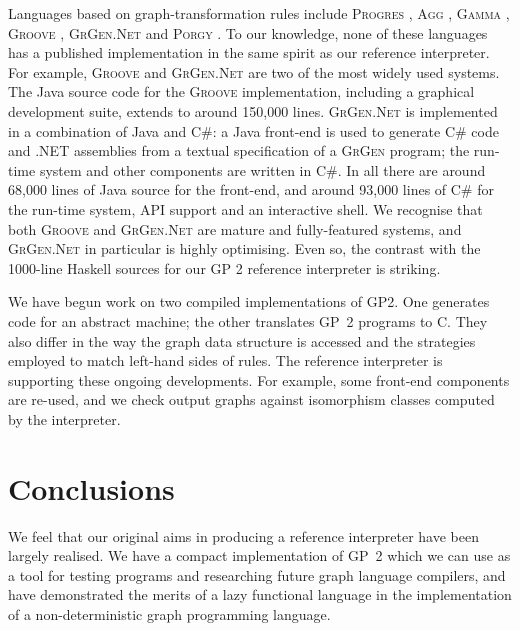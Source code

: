 Languages based on graph-transformation rules include
\textsc{Progres} \cite{Schuerr-Winter-Zuendorf99a},
\textsc{Agg} \cite{Ermel-Rudolf-Taentzer99a,Runge-Ermel-Taentzer11a},
\textsc{Gamma} \cite{Fradet-LeMetayer98a},
\textsc{Groove} \cite{Ghamarian-deMol-Rensink-Zambon-Zimakova12a},
\textsc{GrGen.Net} \cite{Jakumeit-Buchwald-Kroll10a} and
\textsc{Porgy} \cite{Fernandez-Kirchner-Mackie-Pinaud14a}.
To our knowledge, none of these languages has a published implementation in the same spirit as our reference interpreter. For example, \textsc{Groove} and \textsc{GrGen.Net} are two of the most widely used systems. The Java source code for the \textsc{Groove} implementation, including a graphical development suite, extends to around 150,000 lines. \textsc{GrGen.Net} is implemented in a combination of Java and C\#: a Java front-end is used to generate C\# code and .NET assemblies from a textual specification of a \textsc{GrGen} program; the run-time system and other components are written in C\#. In all there are around 68,000 lines of Java source for the front-end, and around 93,000 lines of C\# for the run-time system, API support and an interactive shell.
We recognise that both \textsc{Groove} and \textsc{GrGen.Net} are mature and fully-featured systems, and \textsc{GrGen.Net} in particular is highly optimising. Even so, the contrast with the 1000-line Haskell sources for our GP 2 reference interpreter is striking.

We have begun work on two compiled implementations of GP2. One generates code for an abstract machine; the other translates GP~2 programs to C. They also differ in the way the graph data structure is accessed and the strategies employed to match left-hand sides of rules. The reference interpreter is supporting these ongoing developments. For example, some front-end components are re-used, and we check output graphs against isomorphism classes
computed by the interpreter.


\section{Conclusions}
\label{sec:conclusions}


We feel that our original aims in producing a reference interpreter have been largely realised. We have a compact implementation of GP~2 which we can use as a tool for testing programs and researching future graph language compilers, and have demonstrated the merits of a lazy functional language in the implementation of a non-deterministic graph programming language.

